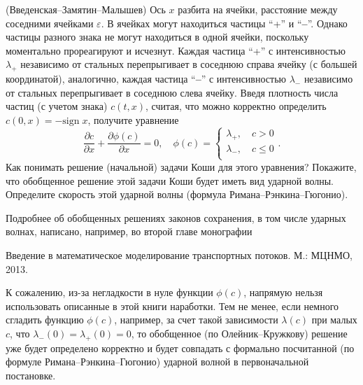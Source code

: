 \begin{problem}\Star(Введенская--Замятин--Малышев) 
Ось $x$ разбита на ячейки, расстояние между 
соседними ячейками $\varepsilon $. В ячейках могут находиться частицы ``+'' 
и ``\textbf{--}''. Однако частицы разного знака не могут находиться в одной 
ячейки, поскольку моментально прореагируют и исчезнут. Каждая частица ``+'' 
с интенсивностью $\lambda _+ $ независимо от стальных перепрыгивает в 
соседнюю справа ячейку (с большей координатой), аналогично, каждая частица 
``\textbf{--}'' с интенсивностью $\lambda _- $ независимо от стальных 
перепрыгивает в соседнюю слева ячейку. Введя плотность числа частиц (с 
учетом знака) $c\left( {t,x} \right)$, считая, что можно корректно 
определить $c\left( {0,x} \right)=-\mbox{sign}\;x$, получите уравнение
\[
\frac{\partial c}{\partial x}+\frac{\partial \phi \left( c \right)}{\partial 
x}=0,
\quad
\phi \left( c \right)=\left\{ {\begin{array}{l}
 \lambda _+ ,\quad c>0 \\ 
 \lambda _- ,\quad c\le 0 \\ 
 \end{array}} \right..
\]
Как понимать решение (начальной) задачи Коши для этого уравнения? Покажите, 
что обобщенное решение этой задачи Коши будет иметь вид ударной волны. 
Определите скорость этой ударной волны (формула Римана--Рэнкина--Гюгонио).
\end{problem}

\begin{remark}
Подробнее об обобщенных решениях законов сохранения, в 
том числе ударных волнах, написано, например, во второй главе монографии

Введение в математическое моделирование транспортных потоков. М.: МЦНМО, 
2013.

К сожалению, из-за негладкости в нуле функции $\phi \left( c \right)$, 
напрямую нельзя использовать описанные в этой книги наработки. Тем не менее, 
если немного сгладить функцию $\phi \left( c \right)$, например, за счет 
такой зависимости $\lambda \left( c \right)$ при малых $c$, что $\lambda _- 
\left( 0 \right)=\lambda _+ \left( 0 \right)=0$, то обобщенное (по 
Олейник--Кружкову) решение уже будет определено корректно и будет совпадать 
с формально посчитанной (по формуле Римана--Рэнкина--Гюгонио) ударной волной 
в первоначальной постановке.
\end{remark}


